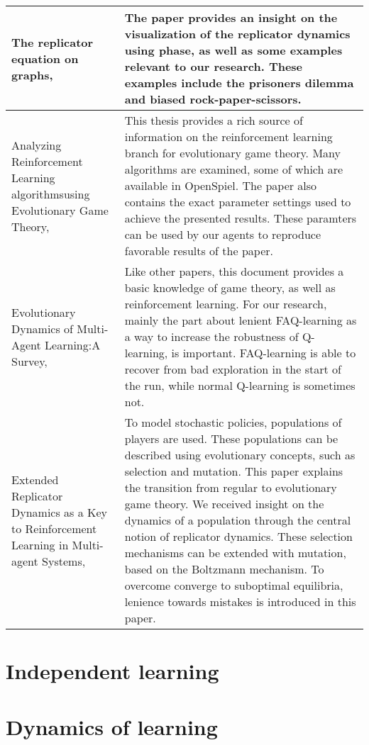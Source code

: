\documentclass[10pt,a4paper]{article}
\begin{document}
\begin{longtable}{|p{4cm}|p{9cm}|}
\hline 
The replicator equation on graphs, \citet{Ohtsuki2006TheRE} & The paper provides an insight on the visualization of the replicator dynamics using phase, as well as some examples relevant to our research. These examples include the prisoners dilemma and biased rock-paper-scissors.\\
\hline
Analyzing Reinforcement Learning algorithmsusing Evolutionary Game Theory, \citet{bloembergenmaster} & This thesis provides a rich source of information on the reinforcement learning branch for evolutionary game theory. Many algorithms are examined, some of which are available in OpenSpiel. The paper also contains the exact parameter settings used to achieve the presented results. These paramters can be used by our agents to reproduce favorable results of the paper. \\
\hline
Evolutionary Dynamics of Multi-Agent Learning:A Survey, \citet{evoldynamics} & Like other papers, this document provides a basic knowledge of game theory, as well as reinforcement learning. For our research, mainly the part about lenient FAQ-learning as a way to increase the robustness of Q-learning, is important. FAQ-learning is able to recover from bad exploration in the start of the run, while normal Q-learning is sometimes not. \\
\hline
Extended Replicator Dynamics as a Key to Reinforcement Learning in Multi-agent Systems, \citet{extrepl} & To model stochastic policies, populations of players are used. These populations can be described using evolutionary concepts, such as selection and mutation. This paper explains the transition from regular to evolutionary game theory. We received insight on the dynamics of a population through the central notion of replicator dynamics. These selection mechanisms can be extended with mutation, based on the Boltzmann mechanism. To overcome converge to suboptimal equilibria, lenience towards mistakes is introduced in this paper.
\\ 
\hline
\end{longtable} 

\section{Independent learning}
\section{Dynamics of learning}


{}

\end{document}
